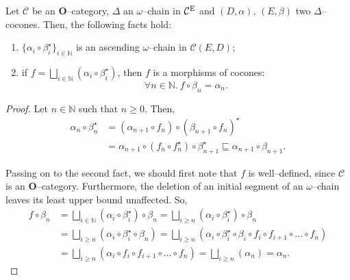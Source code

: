 \begin{lem}\label{lem:3-1}
  Let \(\mathcal{C}\) be an \(\mathbf{O}\)--category, \(\Delta{}\) an \(\omega{}\)--chain in \(\mathcal{C}^\textup{E}\) and \((D,\alpha)\), \((E,\beta)\) two \(\Delta\)--cocones.%
  Then, the following facts hold:
  \begin{enumerate}
    \item \(\lbrace \alpha_i \circ \beta_i^\star \rbrace_{i \in \mathbb{N}}\) is an ascending \(\omega\)--chain in \(\mathcal{C}(E,D)\);%
    \item if \(f = \bigsqcup_{i \in \mathbb{N}}(\alpha_i \circ \beta_i^\star)\), then \(f\) is a morphisms of cocones:
    \begin{equation*}
      \forall n \in \mathbb{N}.\: f \circ \beta_n = \alpha_n.
    \end{equation*}
  \end{enumerate}
\end{lem}
\begin{proof}
  Let \(n \in \mathbb{N}\) such that \(n \ge 0\). Then,
  \begin{equation*}
    \begin{split}
      \alpha_n \circ \beta_n^\star &=
      (\alpha_{n+1} \circ f_n) \circ {(\beta_{n+1} \circ f_n)}^\star \\
      &= \alpha_{n+1} \circ (f_n \circ f_n^\star) \circ \beta_{n+1}^\star
      \sqsubseteq \alpha_{n+1} \circ \beta_{n+1}.
    \end{split}
  \end{equation*}

  Passing on to the second fact, we should first note that \(f\) is well--defined, since \(\mathcal{C}\) is an \(\mathbf{O}\)--category. %
  Furthermore, the deletion of an initial segment of an \(\omega\)--chain leaves its least upper bound unaffected. %
  So,
  \begin{equation*}
    \begin{split}
      f \circ \beta_n &=
      \bigsqcup_{i \in \mathbb{N}}(\alpha_i \circ \beta_i^\star) \circ \beta_n
      = \bigsqcup_{i \ge n}(\alpha_i \circ \beta_i^\star) \circ \beta_n \\
      &= \bigsqcup_{i \ge n}(\alpha_i \circ \beta_i^\star \circ \beta_n)
      = \bigsqcup_{i \ge n}(\alpha_i \circ \beta_i^\star \circ \beta_i \circ f_i \circ f_{i+1} \circ \dotsc \circ f_n) \\
      &= \bigsqcup_{i \ge n}(\alpha_i \circ f_i \circ f_{i+1} \circ \dotsc \circ f_n)
      = \bigsqcup_{i \ge n}(\alpha_n) = \alpha_n.
    \end{split}
  \end{equation*}\qedhere
\end{proof}

